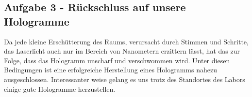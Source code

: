 \subsection*{Aufgabe 3 - Rückschluss auf unsere Hologramme}
Da jede kleine Erschütterung des Raums, verursacht durch Stimmen und Schritte, das Laserlicht auch nur im Bereich von Nanometern erzittern lässt, hat das zur Folge, dass das Hologramm unscharf und verschwommen wird. Unter diesen Bedingungen ist eine erfolgreiche Herstellung eines Hologramms nahezu ausgeschlossen. Interessanter weise gelang es uns trotz des Standortes des Labors einige gute Hologramme herzustellen.